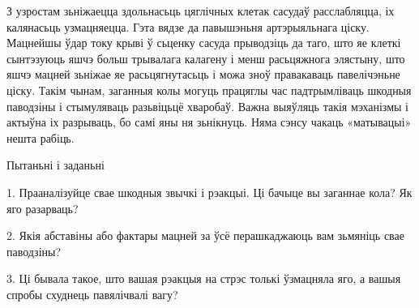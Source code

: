 З узростам зьніжаецца здольнасьць цяглічных клетак сасудаў расслабляцца, іх калянасьць узмацняецца. Гэта вядзе да павышэньня артэрыяльнага ціску. Мацнейшы ўдар току крыві ў сьценку сасуда прыводзіць да таго, што яе клеткі сынтэзуюць яшчэ больш трывалага калагену і менш расьцяжнога элястыну, што яшчэ мацней зьніжае яе расьцягнутасьць і можа зноў правакаваць павелічэньне ціску. Такім чынам, заганныя колы могуць працяглы час падтрымліваць шкодныя паводзіны і стымуляваць разьвіцьцё хваробаў. Важна выяўляць такія мэханізмы і актыўна іх разрываць, бо самі яны ня зьнікнуць. Няма сэнсу чакаць «матывацыі» нешта рабіць.

Пытаньні і заданьні

1. Прааналізуйце свае шкодныя звычкі і рэакцыі. Ці бачыце вы заганнае кола? Як яго разарваць?

2. Якія абставіны або фактары мацней за ўсё перашкаджаюць вам зьмяніць свае паводзіны?

3. Ці бывала такое, што вашая рэакцыя на стрэс толькі ўзмацняла яго, а вашыя спробы схуднець павялічвалі вагу?


